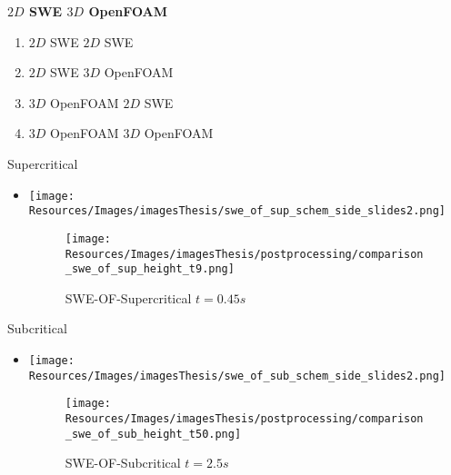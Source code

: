 \begin{frame}
\begin{minipage}{0.5\textwidth}
\large  \textbf{$2D$ SWE    $3D$ OpenFOAM }
\end{minipage}
\hspace{4cm}
\begin{minipage}{0.21\textwidth}
\vspace{-1.5cm}
{\scriptsize
\begin{tcolorbox}[colframe=black, colback=white] 
\setlength{\leftmargini}{0pt}
\begin{enumerate}
\item[] {\color{black!20}$2D$ SWE    $2D$ SWE}
\item[] $2D$ SWE    $3D$ OpenFOAM
\item[] {\color{black!60}$3D$ OpenFOAM     $2D$ SWE}
\item[] {\color{black!20}$3D$ OpenFOAM     $3D$ OpenFOAM}
\end{enumerate}
\end{tcolorbox}}
\end{minipage}

\begin{minipage}{0.45\textwidth}
\centering
Supercritical
\begin{itemize}
\item<2->[]
\begin{minipage}{0.2\textwidth}
\texttt{[image: Resources/Images/imagesThesis/swe\_of\_sup\_schem\_side\_slides2.png]}
\end{minipage}
\begin{minipage}{0.75\textwidth}
\begin{figure}
\texttt{[image: Resources/Images/imagesThesis/postprocessing/comparison\_swe\_of\_sup\_height\_t9.png]}
\caption{SWE-OF-Supercritical $t=0.45s$}
\end{figure}
\end{minipage}
\end{itemize}
\end{minipage}
\begin{minipage}{0.45\textwidth}
\centering
Subcritical\\
\begin{itemize}
\item<3->[]
\begin{minipage}{0.2\textwidth}
\texttt{[image: Resources/Images/imagesThesis/swe\_of\_sub\_schem\_side\_slides2.png]}
\end{minipage}
\begin{minipage}{0.75\textwidth}
\begin{figure}
\texttt{[image: Resources/Images/imagesThesis/postprocessing/comparison\_swe\_of\_sub\_height\_t50.png]}
\caption{SWE-OF-Subcritical $t=2.5s$}
\end{figure}
\end{minipage}
\end{itemize}
\end{minipage}
\end{frame}


